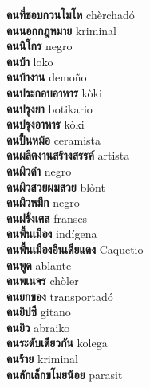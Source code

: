 \textbf{ คนที่ชอบกวนโมโห  } chèrchadó \\
\textbf{ คนนอกกฎหมาย  } kriminal \\
\textbf{ คนนิโกร  } negro \\
\textbf{ คนบ้า  } loko \\
\textbf{ คนบ้างาน  } demoño \\
\textbf{ คนประกอบอาหาร  } kòki \\
\textbf{ คนปรุงยา  } botikario \\
\textbf{ คนปรุงอาหาร  } kòki \\
\textbf{ คนปั้นหม้อ  } ceramista \\
\textbf{ คนผลิตงานสร้างสรรค์  } artista \\
\textbf{ คนผิวดำ  } negro \\
\textbf{ คนผิวสวยผมสวย  } blònt \\
\textbf{ คนผิวหมึก  } negro \\
\textbf{ คนฝรั่งเศส  } franses \\
\textbf{ คนพื้นเมือง  } indígena \\
\textbf{ คนพื้นเมืองอินเดียแดง  } Caquetio \\
\textbf{ คนพูด  } ablante \\
\textbf{ คนพเนจร  } chòler \\
\textbf{ คนยกของ  } transportadó \\
\textbf{ คนยิปซี  } gitano \\
\textbf{ คนยิว  } abraiko \\
\textbf{ คนระดับเดียวกัน  } kolega \\
\textbf{ คนร้าย  } kriminal \\
\textbf{ คนลักเล็กขโมยน้อย  } parasit \\
